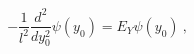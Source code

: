 \begin{equation}
\label{eq:Schroedinger equation}
    -\frac{1}{l^2} \frac{d^2}{dy_0^2} \psi(y_0) =
     E_Y \psi(y_0) \ ,
\end{equation}

